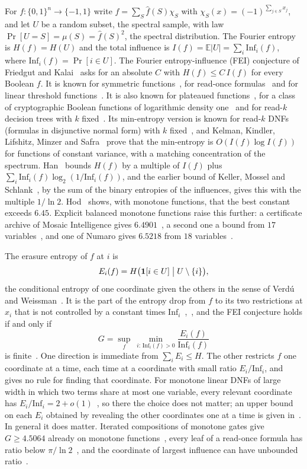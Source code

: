 \documentclass[11pt]{amsart}
\theoremstyle{remark}
\newcommand{\Inf}{\mathrm{Inf}}
\newcommand{\E}{\mathbb{E}}
\begin{document}
For $f\colon\{0,1\}^n\to\{-1,1\}$ write $f=\sum_S\hat f(S)\chi_S$ with $\chi_S(x)=(-1)^{\sum_{j\in S}x_j}$, and let $U$
be a random subset, the spectral sample, with law $\Pr[U=S]=\mu(S)=\hat f(S)^2$, the spectral distribution. The Fourier entropy is $H(f)=H(U)$ and the total influence is
$I(f)=\E|U|=\sum_i\Inf_i(f)$, where $\Inf_i(f)=\Pr[i\in U]$. The Fourier entropy-influence (FEI) conjecture of Friedgut
and Kalai~\cite{FK96} asks for an absolute $C$ with $H(f)\le C\,I(f)$ for every Boolean $f$. It is known for symmetric
functions~\cite{OWZ}, for read-once formulas~\cite{OT13,CKLS} and for linear threshold functions~\cite{Shm2}. It is
also known for plateaued functions~\cite{Pot26}, for a class of cryptographic Boolean functions of logarithmic density
one~\cite{GS14} and for read-$k$ decision trees with $k$ fixed~\cite{WWW}. Its min-entropy version is known for read-$k$ DNFs (formulas in disjunctive normal form) with $k$
fixed~\cite{Shalev,ACKSW}, and Kelman, Kindler, Lifshitz, Minzer and Safra~\cite{KKLMS} prove that the min-entropy is
$O(I(f)\log I(f))$ for functions of constant variance, with a matching concentration of the spectrum. Han~\cite{Han} bounds $H(f)$ by a multiple of $I(f)$ plus $\sum_i\Inf_i(f)\log_2(1/\Inf_i(f))$, and the earlier bound of Keller, Mossel and Schlank~\cite[Claim~4.1]{KMS12}, by the sum of the binary entropies of the influences, gives this with the multiple $1/\ln 2$. Hod~\cite{Hod} shows, with monotone functions, that the best constant exceeds $6.45$. Explicit balanced monotone
functions raise this further: a certificate archive of Mosaic Intelligence gives $6.4901$~\cite{MI26a}, a second one
a bound from $17$ variables~\cite{MI26b}, and one of Numaro gives $6.5218$ from $18$ variables~\cite{Num26}.

The erasure entropy of $f$ at $i$ is
\[
E_i(f)=H\bigl(\mathbf 1[i\in U]\bigm| U\setminus\{i\}\bigr),
\]
the conditional entropy of one coordinate given the others in the sense of Verd\'u and Weissman~\cite{VW08}. It is the part of the entropy drop from $f$ to its two restrictions at $x_i$ that is not controlled by a constant times
$\Inf_i$~\cite[Remarks~3.1--3.2]{Han},~\cite[(32)]{GMP}, and the FEI conjecture holds if and only if
\[
G=\sup_f\ \min_{i:\,\Inf_i(f)>0}\frac{E_i(f)}{\Inf_i(f)}
\]
is finite~\cite{Shm1}. One direction is immediate from $\sum_iE_i\le H$. The other restricts $f$ one coordinate at a
time, each time at a coordinate with small ratio $E_i/\Inf_i$, and gives no rule for finding that coordinate. For
monotone linear DNFs of large width in which two terms share at most one variable, every relevant coordinate has
$E_i/\Inf_i=2+o(1)$~\cite{Shm6}, so there the choice does not matter; an upper bound on each $E_i$ obtained by
revealing the other coordinates one at a time is given in~\cite{Shm5}. In general it does matter. Iterated
compositions of monotone gates give $G\ge4.5064$ already on monotone functions~\cite[Proposition~3.1]{Shm3}, every
leaf of a read-once formula has ratio below $\pi/\ln2$~\cite[Theorem~4.3]{Shm3}, and the coordinate of largest
influence can have unbounded ratio~\cite[Proposition~5.1]{Shm3}.
\end{document}
